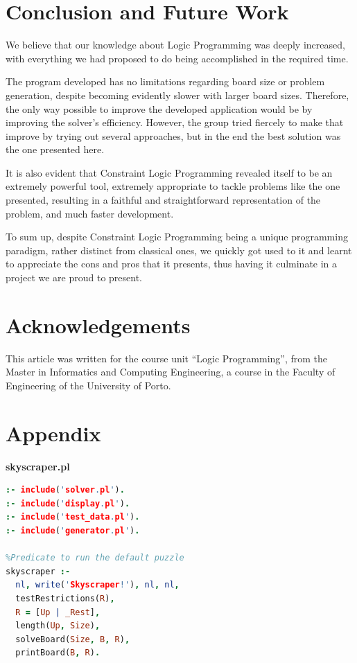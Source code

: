 \documentclass{llncs}
\begin{document}
%
\section{Conclusion and Future Work}

We believe that our knowledge about Logic Programming was deeply increased, with everything we had proposed to do being accomplished in the required time.

The program developed has no limitations regarding board size or problem generation, despite becoming evidently slower with larger board sizes. Therefore, the only way possible to improve the developed application would be by improving the solver's efficiency. However, the group tried fiercely to make that improve by trying out several approaches, but in the end the best solution was the one presented here.

It is also evident that Constraint Logic Programming revealed itself to be an extremely powerful tool, extremely appropriate to tackle problems like the one presented, resulting in a faithful and straightforward representation of the problem, and much faster development.

To sum up, despite Constraint Logic Programming being a unique programming paradigm, rather distinct from classical ones, we quickly got used to it and learnt to appreciate the cons and pros that it presents, thus having it culminate in a project we are proud to present.

%
\section{Acknowledgements}
This article was written for the course unit ``Logic Programming'', from the Master in Informatics and Computing Engineering, a course in the Faculty of Engineering of the University of Porto.


%
%
\clearpage
{}
\renewcommand\refname{References}




\newpage
\appendix
\section{Appendix}

\huge\textbf{skyscraper.pl}
\begin{lstlisting}[language=Prolog]
:- include('solver.pl').
:- include('display.pl').
:- include('test_data.pl').
:- include('generator.pl').

%Predicate to run the default puzzle
skyscraper :-
  nl, write('Skyscraper!'), nl, nl,
  testRestrictions(R),
  R = [Up | _Rest],
  length(Up, Size),
  solveBoard(Size, B, R),
  printBoard(B, R).
\end{lstlisting}
\newpage
\end{document}
